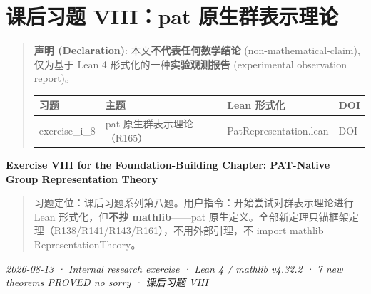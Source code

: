 \documentclass[
]{article}
\author{}
\date{}
\newcounter{none} %
\begin{document}
\section{课后习题 VIII：pat
原生群表示理论}\label{ux7b51ux57faux7bc7ux8bfeux540eux4e60ux9898-viiipat-ux539fux751fux7fa4ux8868ux793aux7406ux8bba}

\begin{quote}
\textbf{声明 (Declaration)}: 本文\textbf{不代表任何数学结论}
(non-mathematical-claim), 仅为基于 Lean 4
形式化的一种\textbf{实验观测报告} (experimental observation report)。

{\def\LTcaptype{none} %
\begin{longtable}[]{@{}
 >{\raggedright\arraybackslash}p{}
 >{\raggedright\arraybackslash}p{}
 >{\raggedright\arraybackslash}p{}
 >{\raggedright\arraybackslash}p{}@{}}
\toprule\noalign{}
\begin{minipage}[b]{\linewidth}\raggedright
习题
\end{minipage} & \begin{minipage}[b]{\linewidth}\raggedright
主题
\end{minipage} & \begin{minipage}[b]{\linewidth}\raggedright
Lean 形式化
\end{minipage} & \begin{minipage}[b]{\linewidth}\raggedright
DOI
\end{minipage} \\
\midrule\noalign{}
\endhead
\bottomrule\noalign{}
\endlastfoot
exercise\_i\_8 & pat 原生群表示理论（R165） & PatRepresentation.lean &
DOI \\
\end{longtable}
}
\end{quote}

\textbf{Exercise VIII for the Foundation-Building Chapter: PAT-Native
Group Representation Theory}

\begin{quote}
习题定位：课后习题系列第八题。用户指令：开始尝试对群表示理论进行
Lean 形式化，但\textbf{不抄 mathlib}------pat
原生定义。全部新定理只锚框架定理（R138/R141/R143/R161），不用外部引理，不
import mathlib RepresentationTheory。
\end{quote}

\emph{2026-08-13 · Internal research exercise · Lean 4 / mathlib v4.32.2
· 7 new theorems PROVED no sorry · 课后习题 VIII }
\end{document}
